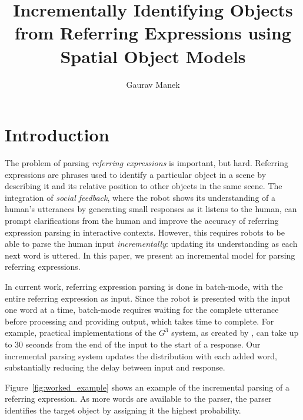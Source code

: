 \documentclass[conference]{IEEEtran}
\title{Incrementally Identifying Objects from Referring Expressions using Spatial Object Models}
\author{Gaurav Manek}
\numberwithin{equation}{section}
\begin{document}
\maketitle


\section{Introduction}

The problem of parsing \emph{referring expressions} is important, but hard. Referring expressions are phrases used to identify a particular object in a scene by describing it and its relative position to other objects in the same scene. The integration of \emph{social feedback}, where the robot shows its understanding of a human's utterances by generating small responses as it listens to the human, can prompt clarifications from the human and improve the accuracy of referring expression parsing in interactive contexts. However, this requires robots to be able to parse the human input \emph{incrementally}: updating its understanding as each next word is uttered. In this paper, we present an incremental model for parsing referring expressions. 

In current work, referring expression parsing is done in batch-mode, with the entire referring expression as input. \citep{tellex2011understanding,UW_RSE_ICML2012,artzi2013weakly,fang2015embodied} Since the robot is presented with the input one word at a time, batch-mode requires waiting for the complete utterance before processing and providing output, which takes time to complete. For example, practical implementations of the $G^3$ system, as created by \citet{tellex2011understanding}, can take up to 30 seconds from the end of the input to the start of a response. Our incremental parsing system updates the distribution with each added word, substantially reducing the delay between input and response.

Figure~\ref{fig:worked_example} shows an example of the incremental parsing of a referring expression. As more words are available to the parser, the parser identifies the target object by assigning it the highest probability.
\end{document}
